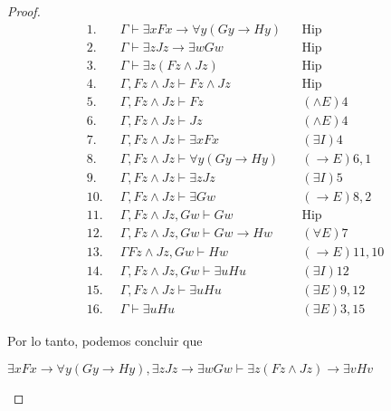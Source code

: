\documentclass[letterpaper,12pt]{article}
\begin{document}
\begin{enumerate}
\begin{enumerate}
\begin{proof}
            \begin{align*}
                1. \; \; &\Gamma \vdash \exists x Fx \rightarrow 
                \forall y(Gy \rightarrow Hy)
                && \text{Hip} \\
                2. \; \; &\Gamma \vdash \exists z Jz \rightarrow 
                \exists w Gw
                && \text{Hip} \\
                3. \; \; &\Gamma \vdash \exists z(Fz \land Jz)
                && \text{Hip} \\
                4. \; \; &\Gamma, Fz \land Jz \vdash Fz \land Jz
                && \text{Hip} \\
                5. \; \; &\Gamma, Fz \land Jz \vdash Fz 
                && \text{$(\land E) 4$} \\
                6. \; \; &\Gamma, Fz \land Jz \vdash Jz
                && \text{$(\land E) 4$} \\
                7. \; \; &\Gamma, Fz \land Jz \vdash \exists x Fx
                && \text{$(\exists I) 4$} \\
                8. \; \; &\Gamma, Fz \land Jz \vdash \forall y(Gy 
                \rightarrow Hy)
                && \text{$(\rightarrow E) 6,1$} \\
                9. \; \; &\Gamma, Fz \land Jz \vdash \exists z Jz
                && \text{$(\exists I) 5$} \\
                10. \; \; &\Gamma, Fz \land Jz \vdash \exists Gw
                && \text{$(\rightarrow E) 8, 2$} \\
                11. \; \;  &\Gamma, Fz \land Jz, Gw \vdash Gw 
                && \text{Hip} \\
                12. \; \; &\Gamma, Fz \land Jz, Gw \vdash Gw \rightarrow Hw
                && \text{$(\forall E) 7$} \\
                13. \; \; &\Gamma Fz \land Jz, Gw \vdash Hw 
                && \text{$(\rightarrow E) 11,10$} \\
                14. \; \; &\Gamma, Fz \land Jz, Gw \vdash \exists u Hu
                && \text{$(\exists I) 12$} \\
                15. \; \; &\Gamma, Fz \land Jz \vdash \exists u Hu
                && \text{$(\exists E) 9, 12$} \\
                16. \; \; &\Gamma \vdash \exists u Hu 
                && \text{$(\exists E) 3, 15$}
            \end{align*}

            Por lo tanto, podemos concluir que 

            \begin{center}
                $\exists x Fx \rightarrow \forall y (Gy \rightarrow Hy),
                \exists z Jz \rightarrow \exists w Gw 
                \vdash \exists z (Fz \land Jz) \rightarrow \exists v Hv$
            \end{center}
        \end{proof}
    \end{enumerate}
\end{enumerate}
\end{document}
